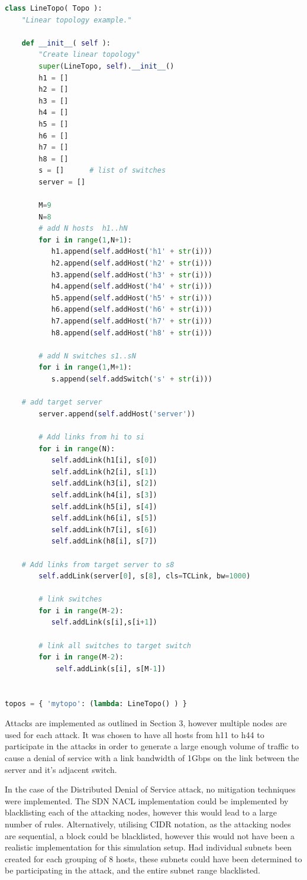 \begin{lstlisting}[language=python, caption=DDoS Simulation Network Topology]
class LineTopo( Topo ):
    "Linear topology example."

    def __init__( self ):
        "Create linear topology"
        super(LineTopo, self).__init__()
        h1 = []
        h2 = []
        h3 = []
        h4 = []
        h5 = []
        h6 = []
        h7 = []
        h8 = []
        s = []		# list of switches
        server = []

        M=9
        N=8
        # add N hosts  h1..hN
        for i in range(1,N+1):
           h1.append(self.addHost('h1' + str(i)))
           h2.append(self.addHost('h2' + str(i)))
           h3.append(self.addHost('h3' + str(i)))
           h4.append(self.addHost('h4' + str(i)))
           h5.append(self.addHost('h5' + str(i)))
           h6.append(self.addHost('h6' + str(i)))
           h7.append(self.addHost('h7' + str(i)))
           h8.append(self.addHost('h8' + str(i)))

        # add N switches s1..sN
        for i in range(1,M+1):
           s.append(self.addSwitch('s' + str(i)))

	# add target server
        server.append(self.addHost('server'))

        # Add links from hi to si
        for i in range(N):
           self.addLink(h1[i], s[0])
           self.addLink(h2[i], s[1])
           self.addLink(h3[i], s[2])
           self.addLink(h4[i], s[3])
           self.addLink(h5[i], s[4])
           self.addLink(h6[i], s[5])
           self.addLink(h7[i], s[6])
           self.addLink(h8[i], s[7])

	# Add links from target server to s8
        self.addLink(server[0], s[8], cls=TCLink, bw=1000)

        # link switches
        for i in range(M-2):
           self.addLink(s[i],s[i+1])

        # link all switches to target switch
        for i in range(M-2):
            self.addLink(s[i], s[M-1])


topos = { 'mytopo': (lambda: LineTopo() ) }
\end{lstlisting}

Attacks are implemented as outlined in Section 3, however multiple nodes are
used for each attack. It was chosen to have all hosts from h11 to h44 to
participate in the attacks in order to generate a large enough volume of traffic
to cause a denial of service with a link bandwidth of 1Gbps on the link between
the server and it's adjacent switch.

In the case of the Distributed Denial of Service attack, no mitigation
techniques were implemented. The SDN NACL implementation could be implemented by
blacklisting each of the attacking nodes, however this would lead to a large
number of rules. Alternatively, utilising CIDR notation, as the attacking nodes
are sequential, a block could be blacklisted, however this would not have been a
realistic implementation for this simulation setup. Had individual subnets been
created for each grouping of 8 hosts, these subnets could have been determined
to be participating in the attack, and the entire subnet range blacklisted.
